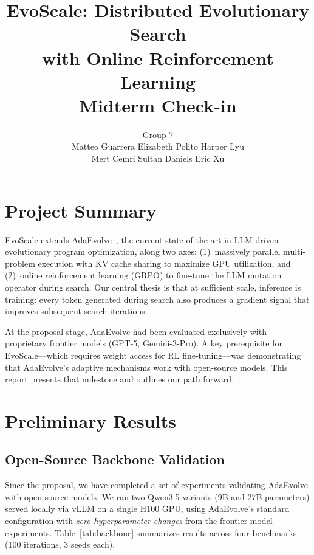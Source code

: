 \documentclass{article}
\author{}
\date{}
\title{EvoScale: Distributed Evolutionary Search\\
  with Online Reinforcement Learning\\[0.3em]
  \large Midterm Check-in}
\author{
Group 7 \\ Matteo Guarrera \quad Elizabeth Polito \quad Harper Lyu \\ Mert Cemri \quad Sultan Daniels \quad Eric Xu
}
\begin{document}
\maketitle
\author{}
\vspace{-0.5cm}

\section*{Project Summary}

EvoScale extends AdaEvolve~\cite{adaevolve2025}, the current state of the art in LLM-driven evolutionary program optimization, along two axes: (1)~massively parallel multi-problem execution with KV cache sharing to maximize GPU utilization, and (2)~online reinforcement learning (GRPO) to fine-tune the LLM mutation operator during search. Our central thesis is that at sufficient scale, inference is training: every token generated during search also produces a gradient signal that improves subsequent search iterations.

At the proposal stage, AdaEvolve had been evaluated exclusively with proprietary frontier models (GPT-5, Gemini-3-Pro). A key prerequisite for EvoScale---which requires weight access for RL fine-tuning---was demonstrating that AdaEvolve's adaptive mechanisms work with open-source models. This report presents that milestone and outlines our path forward.

\section*{Preliminary Results}

\subsection*{Open-Source Backbone Validation}

Since the proposal, we have completed a set of experiments validating AdaEvolve with open-source models. We ran two Qwen3.5 variants (9B and 27B parameters) served locally via vLLM on a single H100 GPU, using AdaEvolve's standard configuration with \emph{zero hyperparameter changes} from the frontier-model experiments. Table~\ref{tab:backbone} summarizes results across four benchmarks (100 iterations, 3 seeds each).
\end{document}
